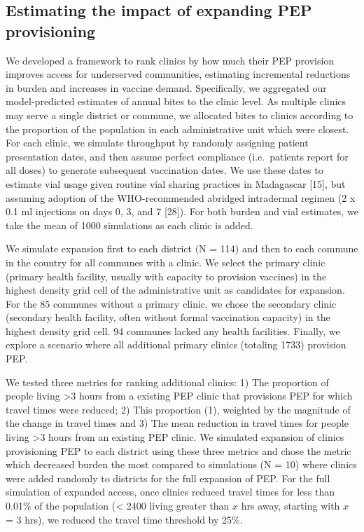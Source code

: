 \documentclass[
  oneside]{book}
\begin{document}
\hypertarget{estimating-the-impact-of-expanding-pep-provisioning}{%
\subsection{Estimating the impact of expanding PEP provisioning}\label{estimating-the-impact-of-expanding-pep-provisioning}}

We developed a framework to rank clinics by how much their PEP provision
improves access for underserved communities, estimating incremental
reductions in burden and increases in vaccine demand. Specifically, we
aggregated our model-predicted estimates of annual bites to the clinic
level. As multiple clinics may serve a single district or commune, we
allocated bites to clinics according to the proportion of the population
in each administrative unit which were closest. For each clinic, we
simulate throughput by randomly assigning patient presentation dates,
and then assume perfect compliance (i.e.~patients report for all doses)
to generate subsequent vaccination dates. We use these dates to estimate
vial usage given routine vial sharing practices in Madagascar {[}15{]},
but assuming adoption of the WHO-recommended abridged intradermal
regimen (2 x 0.1 ml injections on days 0, 3, and 7 {[}28{]}). For both
burden and vial estimates, we take the mean of 1000 simulations as each
clinic is added.

We simulate expansion first to each district (N = 114) and then to each
commune in the country for all communes with a clinic. We select the
primary clinic (primary health facility, usually with capacity to
provision vaccines) in the highest density grid cell of the
administrative unit as candidates for expansion. For the 85 communes
without a primary clinic, we chose the secondary clinic (secondary
health facility, often without formal vaccination capacity) in the
highest density grid cell. 94 communes lacked any health facilities.
Finally, we explore a scenario where all additional primary clinics
(totaling 1733) provision PEP.

We tested three metrics for ranking additional clinics: 1) The
proportion of people living \textgreater3 hours from a existing PEP clinic that
provisions PEP for which travel times were reduced; 2) This proportion
(1), weighted by the magnitude of the change in travel times and 3) The
mean reduction in travel times for people living \textgreater3 hours from an
existing PEP clinic. We simulated expansion of clinics provisioning PEP
to each district using these three metrics and chose the metric which
decreased burden the most compared to simulations (N = 10) where clinics
were added randomly to districts for the full expansion of PEP. For the
full simulation of expanded access, once clinics reduced travel times
for less than 0.01\% of the population (\textless{} 2400 living greater than \(x\)
hrs away, starting with \(x\) = 3 hrs), we reduced the travel time
threshold by 25\%.
\end{document}
